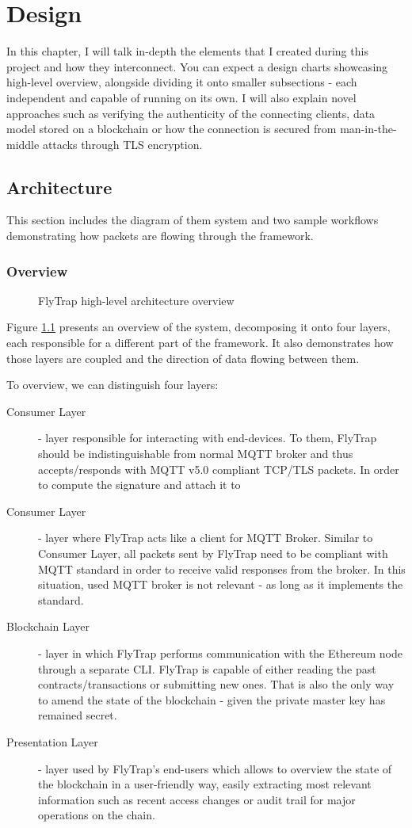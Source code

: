 \chapter{Design\label{chap:design}}
In this chapter, I will talk in-depth the elements that I created during this project and how they interconnect. You can expect a design charts showcasing high-level overview, alongside dividing it onto smaller subsections - each independent and capable of running on its own. I will also explain novel approaches such as verifying the authenticity of the connecting clients, data model stored on a blockchain or how the connection is secured from man-in-the-middle attacks through TLS encryption.

\section{Architecture}
This section includes the diagram of them system and two sample workflows demonstrating how packets are flowing through the framework.
\subsection{Overview}
\begin{figure}[h]
    \centering
    \caption{FlyTrap high-level architecture overview}
    \label{fig:flytrap}
\end{figure}
Figure \ref{fig:flytrap} presents an overview of the system, decomposing it onto four layers, each responsible for a different part of the framework. It also demonstrates how those layers are coupled and the direction of data flowing between them.

To overview, we can distinguish four layers:
\begin{description}
    \item[Consumer Layer] - layer responsible for interacting with end-devices. To them, FlyTrap should be indistinguishable from normal MQTT broker and thus accepts/responds with MQTT v5.0 compliant TCP/TLS packets. In order to compute the signature and attach it to 
    \item[Consumer Layer] - layer where FlyTrap acts like a client for MQTT Broker. Similar to Consumer Layer, all packets sent by FlyTrap need to be compliant with MQTT standard in order to receive valid responses from the broker. In this situation, used MQTT broker is not relevant - as long as it implements the standard.
    \item[Blockchain Layer] - layer in which FlyTrap performs communication with the Ethereum node through a separate CLI. FlyTrap is capable of either reading the past contracts/transactions or submitting new ones. That is also the only way to amend the state of the blockchain - given the private master key has remained secret.
    \item[Presentation Layer] - layer used by FlyTrap's end-users which allows to overview the state of the blockchain in a user-friendly way, easily extracting most relevant information such as recent access changes or audit trail for major operations on the chain.
\end{description}


